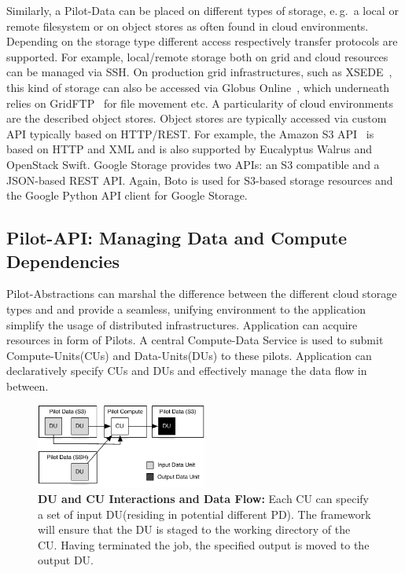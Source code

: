 \documentclass[times]{cpeauth}
\newcommand{\jhanote}[1]{ {\textcolor{red} { ***shantenu: #1 }}}
\newcommand{\jhanote}[1]{}
\newcommand{\pilots}{Pilots\xspace}
\newcommand{\pilotdata}{Pilot-Data\xspace}
\newcommand{\computedataservice}{Compute-Data Service\xspace}
\newcommand{\pd}{PD\xspace}
\newcommand{\computeunits}{Compute-Units\xspace}
\newcommand{\dataunits}{Data-Units\xspace}
\newcommand{\du}{DU\xspace}
\newcommand{\dus}{DUs\xspace}
\newcommand{\cu}{CU\xspace}
\newcommand{\cus}{CUs\xspace}
\begin{document}
Similarly, a \pilotdata can be placed on different types of storage, e.\,g.\ a
local or remote filesystem or on object stores as often found in cloud
environments. Depending on the storage type different access respectively
transfer protocols are supported. For example, local/remote storage both on
grid and cloud resources can be managed via SSH. On production grid
infrastructures, such as XSEDE~\cite{xsede}, this kind of storage can also be
accessed via Globus Online~\cite{10.1109/MIC.2011.64}, which underneath relies
on GridFTP~\cite{ogf-gfd-20} for file movement etc. A particularity of cloud
environments are the described object stores. Object stores are typically
accessed via custom API typically based on HTTP/REST. For example, the Amazon
S3 API~\cite{amazons3api} is based on HTTP and XML and is also supported by
Eucalyptus Walrus and OpenStack Swift. Google Storage provides two APIs: an S3 
compatible and a JSON-based REST API. Again, Boto is used for S3-based storage 
resources and the Google Python API client for Google Storage. 

 


\subsection{Pilot-API: Managing Data and Compute Dependencies}

Pilot-Abstractions can marshal the difference between the different cloud
storage types and and provide a seamless, unifying environment to the
application simplify the usage of distributed infrastructures. Application can 
acquire resources in form of \pilots. A central \computedataservice is used to 
submit \computeunits (\cus) and \dataunits (\dus) to these pilots. Application 
can declaratively specify \cus and \dus and effectively manage the data flow 
in between. 

\begin{figure}
	\centering
		\includegraphics[width=0.5\textwidth]{figures/data-flow.pdf}
	\caption{\textbf{DU and CU Interactions and Data Flow:} Each \cu can specify a set of input \du (residing in potential different \pd). The framework will ensure that the \du is staged to the working directory of the \cu. Having terminated the job, the specified output is moved to the output \du.}
	\label{fig:figures_data-flow}
\end{figure}
\end{document}
